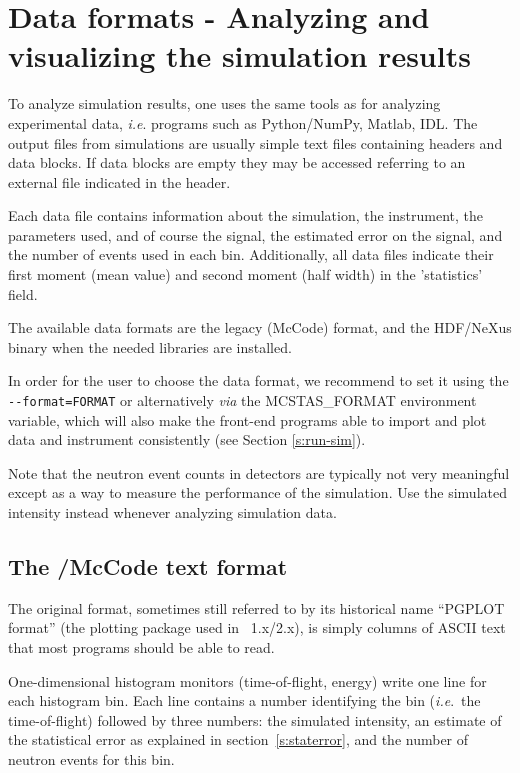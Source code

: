 \section{Data formats - Analyzing and visualizing the simulation results}
\label{s:analyze}

To analyze simulation results, one uses the same tools as for analyzing
experimental data, \textit{i.e}. programs such as Python/NumPy, Matlab, IDL.  The
output files from simulations are usually simple text files containing headers
and data blocks. If data blocks are empty they may be accessed referring to an
external file indicated in the header.

Each data file contains information about the simulation, the instrument, the
parameters used, and of course the signal, the estimated error on the signal,
and the number of events used in each bin. Additionally, all data files indicate
their first moment (mean value) and second moment (half width) in the
'statistics' field.

The available data formats are the legacy \MCS (McCode) format, and the HDF/NeXus binary when the needed libraries are installed.

In order for the user to choose the data format, we recommend to set it using
the \verb+--format=FORMAT+ or alternatively \textit{via} the MCSTAS\_FORMAT
environment variable, which will also make the front-end programs able to import
and plot data and instrument consistently (see Section \ref{s:run-sim}). 

Note that the neutron event counts in detectors are typically not very
meaningful except as a way to measure the performance of the
simulation. Use the simulated intensity instead whenever analyzing
simulation data.

\subsection{The \MCS/McCode text format}
The \MCS original format, sometimes still referred to by its historical name
``PGPLOT format'' (the plotting package used in \MCS~1.x/2.x), is simply
columns of ASCII text that most
programs should be able to read.

One-dimensional histogram monitors (time-of-flight, energy)
write one line for each histogram bin. Each line contains a number
identifying the bin (\textit{i.e}.\ the time-of-flight) followed by
three numbers: the simulated intensity, an estimate of the statistical
error as explained in section~\ref{s:staterror}, and the number of
neutron events for this bin.

